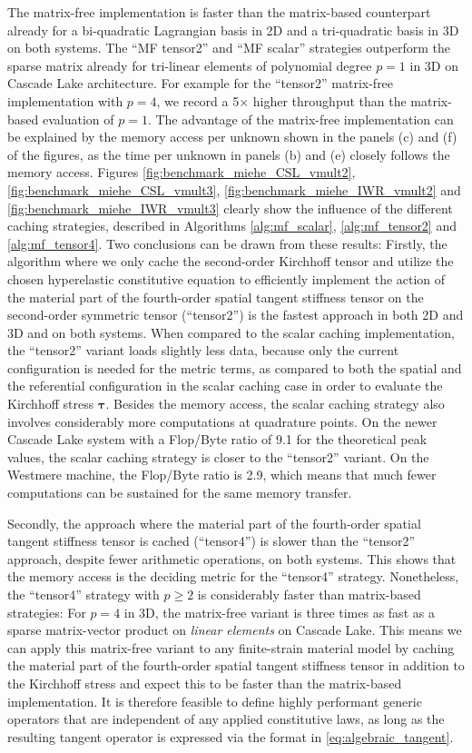 \documentclass[AMA,STIX1COL]{WileyNJD-v2}
\newcommand*{\gz}[1]{\boldsymbol{#1}}
\begin{document}
The matrix-free implementation is faster than the matrix-based counterpart already for a bi-quadratic Lagrangian basis in 2D and a tri-quadratic basis in 3D on both systems.
The ``MF tensor2'' and ``MF scalar'' strategies outperform the sparse matrix already for tri-linear elements of polynomial degree $p=1$ in 3D on Cascade Lake architecture.
For example for the ``tensor2'' matrix-free implementation with $p=4$, we record a 5$\times$ higher throughput than the matrix-based evaluation of $p=1$.
The advantage of the matrix-free implementation can be explained by the memory access per unknown shown in the panels (c) and (f) of the figures,
as the time per unknown in panels (b) and (e) closely follows the memory access.
Figures \ref{fig:benchmark_miehe_CSL_vmult2}, \ref{fig:benchmark_miehe_CSL_vmult3}, \ref{fig:benchmark_miehe_IWR_vmult2} and \ref{fig:benchmark_miehe_IWR_vmult3}
clearly show the influence of the different caching strategies,
described in Algorithms \ref{alg:mf_scalar}, \ref{alg:mf_tensor2} and \ref{alg:mf_tensor4}.
Two conclusions can be drawn from these results:
Firstly, the algorithm where we only cache the second-order Kirchhoff tensor and utilize the chosen hyperelastic constitutive equation to efficiently implement
the action of the material part of the fourth-order spatial tangent stiffness tensor on the second-order symmetric tensor (``tensor2'')
is the fastest approach in both 2D and 3D and on both systems.
When compared to the scalar caching implementation, the ``tensor2'' variant loads slightly less data, because only the current configuration is needed for the metric terms,
as compared to both the spatial and the referential configuration in the scalar caching case in order to evaluate the Kirchhoff stress $\gz \tau$.
Besides the memory access, the scalar caching strategy also involves considerably more computations at quadrature points.
On the newer Cascade Lake system with a Flop/Byte ratio of 9.1 for the theoretical peak values, the scalar caching strategy is closer to the ``tensor2'' variant.
On the {\color{red}Westmere} machine, the Flop/Byte ratio is 2.9, which means that much fewer computations can be sustained for the same memory transfer.

Secondly, the approach where the material part of the fourth-order spatial tangent stiffness tensor is cached (``tensor4'') is slower than the ``tensor2'' approach,
despite fewer arithmetic operations, on both systems.
This shows that the memory access is the deciding metric for the ``tensor4'' strategy.
Nonetheless, the ``tensor4'' strategy with $p\geq 2$ is considerably faster than matrix-based strategies:
For $p=4$ in 3D, the matrix-free variant is three times as fast as a sparse matrix-vector product on \emph{linear elements} on Cascade Lake.
This means we can apply this matrix-free variant to any finite-strain material model by caching the material part of the fourth-order spatial tangent stiffness tensor
in addition to the Kirchhoff stress and expect this to be faster than the matrix-based implementation.
It is therefore feasible to define highly performant generic operators that are independent of any applied constitutive laws,
as long as the resulting tangent operator is expressed via the format in \eqref{eq:algebraic_tangent}.
\end{document}
